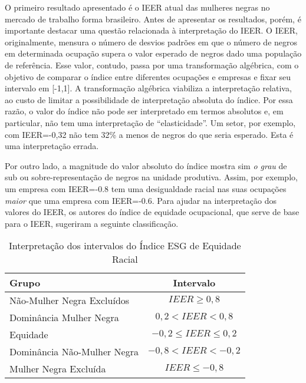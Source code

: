 \documentclass[12pt]{article}
\begin{document}
\par O primeiro resultado apresentado é o IEER atual das mulheres negras no mercado de trabalho forma brasileiro. Antes de apresentar os resultados, porém, é importante destacar uma questão relacionada à interpretação do IEER. O IEER, originalmente, mensura o número de desvios padrões em que o número de negros em determinada ocupação supera o valor esperado de negros dado uma população de referência. Esse valor, contudo, passa por uma transformação algébrica, com o objetivo de comparar o índice entre diferentes ocupações e empresas e fixar seu intervalo em [-1,1]. A transformação algébrica viabiliza a interpretação relativa, ao custo de limitar a possibilidade de interpretação absoluta do índice. Por essa razão, o valor do índice não pode ser interpretado em termos absolutos e, em particular, não tem uma interpretação de \enquote{elasticidade}. Um setor, por exemplo, com IEER=-0,32 não tem 32\% a menos de negros do que seria esperado. Esta é uma interpretação errada.

\par Por outro lado, a magnitude do valor absoluto do índice mostra sim \textit{o grau} de sub ou sobre-representação de negros na unidade produtiva. Assim, por exemplo, um empresa com IEER=-0.8 tem uma desigualdade racial nas suas ocupações \textit{maior} que uma empresa com IEER=-0.6. Para ajudar na interpretação dos valores do IEER, os autores do índice de equidade ocupacional, que serve de base para o IEER, sugeriram a seguinte classificação.\autocite{ransom2001one}

\begin{table}[htb!]
\centering
\caption{Interpretação dos intervalos do Índice ESG de Equidade Racial}
\begin{tabular}{lc}
\hline
Grupo             & Intervalo                 \\ \hline
Não-Mulher Negra Excluídos & $IEER \geq 0, 8 $               \\
Dominância Mulher Negra  & $0,2 < IEER < 0,8$   \\
Equidade          & $-0,2\leq IEER \leq 0,2$  \\
Dominância Não-Mulher Negra & $-0,8 < IEER < -0,2$ \\
Mulher Negra Excluída  & $IEER \leq -0,8$        \\ \hline
\end{tabular}
\end{table}
\end{document}
